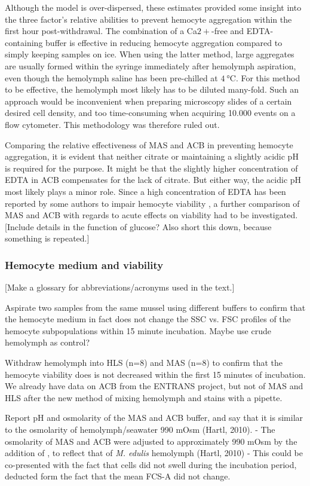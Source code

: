 Although the model is over-dispersed, these estimates provided some insight into the three factor's relative abilities to prevent hemocyte aggregation within the first hour post-withdrawal. The combination of a Ca${2+}$-free and EDTA-containing buffer is effective in reducing hemocyte aggregation compared to simply keeping samples on ice. When using the latter method, large aggregates are usually formed within the syringe immediately after hemolymph aspiration, even though the hemolymph saline has been pre-chilled at $\SI{4}{\celsius}$. For this method to be effective, the hemolymph most likely has to be diluted many-fold. Such an approach would be inconvenient when preparing microscopy slides of a certain desired cell density, and too time-consuming when acquiring 10.000 events on a flow cytometer. This methodology was therefore ruled out.

Comparing the relative effectiveness of MAS and ACB in preventing hemocyte aggregation, it is evident that neither citrate or maintaining a slightly acidic pH is required for the purpose. It might be that the slightly higher concentration of EDTA in ACB compensates for the lack of citrate. But either way, the acidic pH most likely plays a minor role. Since a high concentration of EDTA has been reported by some authors to impair hemocyte viability \cite{Grandiosa2018, Burkhard2009}, a further comparison of MAS and ACB with regards to acute effects on viability had to be investigated. [Include details in the function of glucose? Also short this down, because something is repeated.]

\subsubsection{Hemocyte medium and viability}
[Make a glossary for abbreviations/acronyms used in the text.]

Aspirate two samples from the same mussel using different buffers to confirm that the hemocyte medium in fact does not change the SSC vs. FSC profiles of the hemocyte subpopulations within 15 minute incubation. Maybe use crude hemolymph as control?

Withdraw hemolymph into HLS (n=8) and MAS (n=8) to confirm that the hemocyte viability does is not decreased within the first 15 minutes of incubation. We already have data on ACB from the ENTRANS project, but not of MAS and HLS after the new method of mixing hemolymph and stains with a pipette.

Report pH and osmolarity of the MAS and ACB buffer, and say that it is similar to the osmolarity of hemolymph/seawater 990 mOsm (Hartl, 2010).
- The osmolarity of MAS and ACB were adjusted to approximately 990 mOsm by the addition of , to reflect that of \emph{M. edulis} hemolymph (Hartl, 2010)
- This could be co-presented with the fact that cells did not swell during the incubation period, deducted form the fact that the mean FCS-A did not change.

